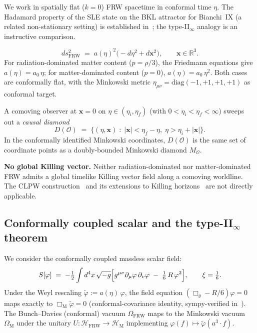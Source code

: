 \documentclass[12pt,a4paper]{article}
\theoremstyle{definition}
\newcommand{\FRW}{\mathrm{FRW}}
\newcommand{\Mink}{\mathrm{M}}
\begin{document}
We work in spatially flat ($k=0$) FRW spacetime in conformal time $\eta$.
The Hadamard property of the SLE state on the BKL attractor for Bianchi~IX
(a related non-stationary setting) is established in~\cite{BIX_lemma_A1};
the type-II$_\infty$ analogy is an instructive comparison.


\begin{equation}
  ds^2_\FRW \;=\; a(\eta)^2\bigl(-d\eta^2 + d\mathbf{x}^2\bigr),
  \qquad \mathbf{x}\in\mathbb{R}^3.
  \label{eq:FRW-metric}
\end{equation}
For radiation-dominated matter content ($p = \rho/3$), the Friedmann
equations give $a(\eta) = a_0\,\eta$; for matter-dominated content
($p = 0$), $a(\eta) = a_0\,\eta^2$.
Both cases are conformally flat, with the Minkowski metric
$\eta_{\mu\nu}=\mathrm{diag}(-1,+1,+1,+1)$ as conformal target.

A comoving observer at $\mathbf{x} = 0$ on $\eta \in (\eta_i, \eta_f)$
(with $0 < \eta_i < \eta_f < \infty$) sweeps out a \emph{causal diamond}
\begin{equation}
  D(\mathcal{O}) \;=\; \bigl\{(\eta,\mathbf{x})\;:\;
  |\mathbf{x}| < \eta_f - \eta,\;\eta > \eta_i + |\mathbf{x}|\bigr\}.
\end{equation}
In the conformally identified Minkowski coordinates, $D(\mathcal{O})$
is the same set of coordinate points as a doubly-bounded Minkowski diamond
$M_\mathcal{O}$.

\textbf{No global Killing vector.}
Neither radiation-dominated nor matter-dominated FRW admits a
global timelike Killing vector field along a comoving worldline.
The CLPW construction~\cite{CLPW2023, Witten2022} and its extensions
to Killing horizons~\cite{FaulknerSperanza2024} are not directly
applicable.

\subsection{Conformally coupled scalar and the type-II$_\infty$ theorem}

We consider the conformally coupled massless scalar field:
\begin{equation}
  S[\varphi] \;=\; -\tfrac{1}{2}\int d^4x\,\sqrt{-g}
  \Bigl[g^{\mu\nu}\partial_\mu\varphi\,\partial_\nu\varphi
        \;-\; \tfrac{1}{6}\,R\,\varphi^2\Bigr],
  \qquad \xi = \tfrac{1}{6}.
  \label{eq:action}
\end{equation}
Under the Weyl rescaling $\tilde\varphi := a(\eta)\,\varphi$, the
field equation $(\Box_g - R/6)\varphi = 0$ maps exactly to
$\Box_\Mink \tilde\varphi = 0$ (conformal-covariance identity,
sympy-verified in~\cite{FRWnote}).
The Bunch--Davies (conformal) vacuum $\Omega_\FRW$ maps to the
Minkowski vacuum $\Omega_\Mink$ under the unitary
$U: \mathcal{H}_\FRW \to \mathcal{H}_\Mink$ implementing
$\varphi(f) \mapsto \tilde\varphi(a^3 \cdot f)$.
\end{document}
